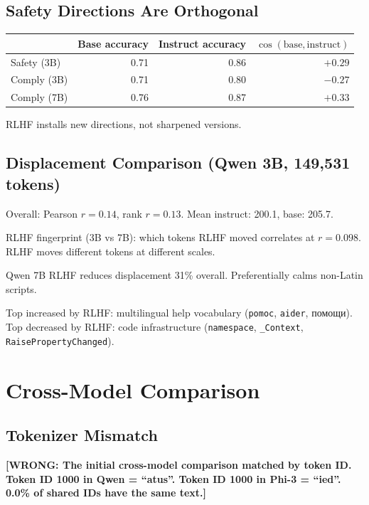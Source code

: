 \documentclass[11pt,a4paper]{report}
\newcommand{\wrong}[1]{\textcolor{wrong}{\textbf{[WRONG: #1]}}}
\begin{document}
\section{Safety Directions Are Orthogonal}

\begin{center}
\begin{tabular}{lrrr}
\toprule
& \textbf{Base accuracy} & \textbf{Instruct accuracy} & $\cos(\text{base}, \text{instruct})$ \\
\midrule
Safety (3B) & 0.71 & 0.86 & $+0.29$ \\
Comply (3B) & 0.71 & 0.80 & $-0.27$ \\
Comply (7B) & 0.76 & 0.87 & $+0.33$ \\
\bottomrule
\end{tabular}
\end{center}

RLHF installs new directions, not sharpened versions.

\section{Displacement Comparison (Qwen 3B, 149,531 tokens)}

Overall: Pearson $r = 0.14$, rank $r = 0.13$. Mean instruct: 200.1, base: 205.7.

RLHF fingerprint (3B vs 7B): which tokens RLHF moved correlates at $r = 0.098$. RLHF moves different tokens at different scales.

Qwen 7B RLHF reduces displacement 31\% overall. Preferentially calms non-Latin scripts.

Top increased by RLHF: multilingual help vocabulary (\texttt{pomoc}, \texttt{aider}, помощи).\\
Top decreased by RLHF: code infrastructure (\texttt{namespace}, \texttt{\_Context}, \texttt{RaisePropertyChanged}).

\chapter{Cross-Model Comparison}

\section{Tokenizer Mismatch}

\wrong{The initial cross-model comparison matched by token ID. Token ID 1000 in Qwen = ``atus''. Token ID 1000 in Phi-3 = ``ied''. 0.0\% of shared IDs have the same text.}
\end{document}
